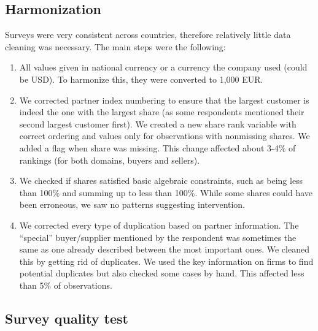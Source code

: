 \usepackage{}\documentclass[final, dvipsnames, authoryear,12pt]{elsarticle}
\begin{document}
\subsection{Harmonization} 

Surveys were very consistent across countries, therefore relatively little data cleaning was necessary. The main steps were the following:

\begin{enumerate}
    \item All values given in national currency or a currency the company used (could be USD). To harmonize this, they were converted to 1,000 EUR. 
    
    \item We corrected partner index numbering to ensure that the largest customer is indeed the one with the largest share (as some respondents mentioned their second largest customer first). We created a new share rank variable with correct ordering and values only for observations with nonmissing shares. We added a flag when share was missing. This change affected about 3-4\% of rankings (for both domains, buyers and sellers). 
    
    \item We checked if shares satisfied basic algebraic constraints, such as being less than 100\% and summing up to less than 100\%. While some shares could have been erroneous, we saw no patterns suggesting intervention.
    
    \item We corrected every type of duplication based on partner information. The ``special'' buyer/supplier mentioned by the respondent was sometimes the same as one already described between the most important ones. We cleaned this by getting rid of duplicates. We used the key information on firms to find potential duplicates but also checked some cases by hand. This affected less than 5\% of observations.

\end{enumerate}

\subsection{Survey quality test}
\label{sec:quality_test}

\end{document}

